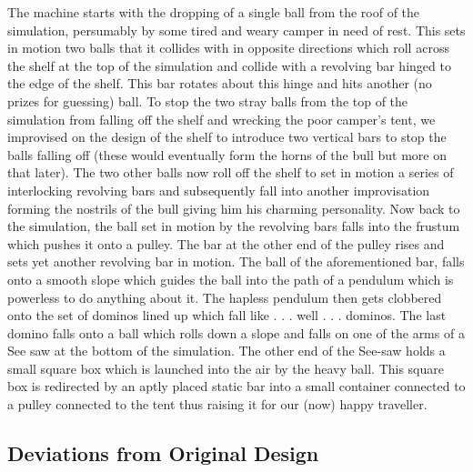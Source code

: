 \documentclass[11pt] {article}
\begin{document}
The machine starts with the dropping of a single ball from the roof of the simulation, persumably by some tired and
weary camper in need of rest. This sets in motion two balls that it collides with in opposite directions which roll 
across the shelf at the top of the simulation and collide with a revolving bar hinged to the edge of the shelf. 
This bar rotates about this hinge and hits another (no prizes for guessing) ball. To stop the two stray balls from
the top of the simulation from falling off the shelf and wrecking the poor camper's tent, we improvised on the
design of the shelf to introduce two vertical bars to stop the balls falling off (these would eventually form the
horns of the bull but more on that later). The two other balls now roll off the shelf to set in motion a series of
interlocking revolving bars and subsequently fall into another improvisation forming the nostrils of the bull giving
him his charming personality. Now back to the simulation, the ball set in motion by the revolving bars falls into
the frustum which pushes it onto a pulley. The bar at the other end of the pulley rises and sets yet another
revolving bar in motion. The ball of the aforementioned bar, falls onto a smooth slope which guides the ball into
the path of a pendulum which is powerless to do anything about it. The hapless pendulum then gets clobbered onto 
the set of dominos lined up which fall like . . . well . . . dominos. The last domino falls onto a ball which rolls
down a slope and falls on one of the arms of a See saw at the bottom of the simulation. The other end of the See-saw
holds a small square box which is launched into the air by the heavy ball. This square box is redirected by an 
aptly placed static bar into a small container connected to a pulley connected to the tent thus raising it for
our (now) happy traveller.

\subsection {Deviations from Original Design}
\end{document}
